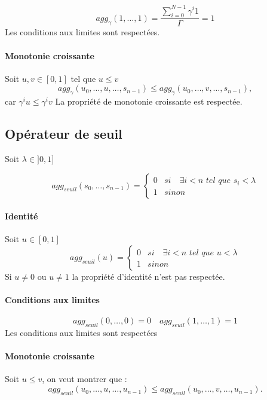 $$agg_\gamma(1,\dots,1) = \frac{ \sum_{i=0}^{N-1}\gamma^i1}{\Gamma}=1$$
Les conditions aux limites sont respectées.
\paragraph{Monotonie croissante}
Soit $u,v\in [0,1]$ tel que $u\leq v$ 
$$agg_{\gamma}(u_0,\dots,u,\dots,s_{n-1}) \leq agg_{\gamma}(u_0,\dots,v,\dots,s_{n-1}),$$ car $\gamma^iu\leq \gamma^iv$
La propriété de monotonie croissante est respectée.


\subsection{Opérateur de seuil}

Soit $\lambda \in ]0,1]$

\begin{equation}
    agg_{seuil}(s_0,\dots,s_{n-1}) = \begin{cases}
        0 & si \quad \exists i<n \textit{ tel que } s_i < \lambda
        \\ 1 & sinon
    \end{cases}
\end{equation}

\paragraph{Identité}
Soit $u\in [0,1]$
$$agg_{seuil}(u)=\begin{cases}
        0 & si \quad \exists i<n \textit{ tel que } u < \lambda
        \\ 1 & sinon
        \end{cases}$$
Si $u\neq 0$ ou $u\neq1$ la propriété d'identité n'est pas respectée.

\paragraph{Conditions aux limites}


$$agg_{seuil}(0,\dots,0) = 0 \quad agg_{seuil}(1,\dots,1) = 1 $$    
Les conditions aux limites sont respectées

\paragraph{Monotonie croissante}

Soit $u\leq v$, on veut montrer que : 
\begin{equation*}
    agg_{seuil}(u_0,\dots,u,\dots,u_{n-1}) \leq agg_{seuil}(u_0,\dots,v,\dots,u_{n-1}).
\end{equation*}

